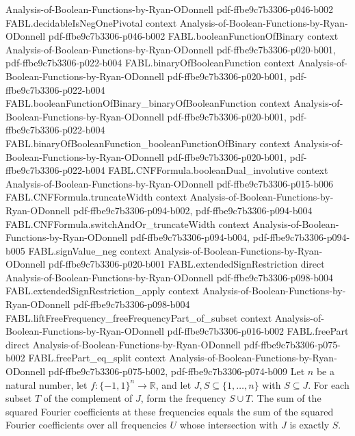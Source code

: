 \begin{theorem}
  {Analysis-of-Boolean-Functions-by-Ryan-ODonnell}
  {pdf-ffbe9c7b3306-p046-b002}
\proofstep
  {FABL.decidableIsNegOnePivotal}
  {context}
  {Analysis-of-Boolean-Functions-by-Ryan-ODonnell}
  {pdf-ffbe9c7b3306-p046-b002}
\proofstep
  {FABL.booleanFunctionOfBinary}
  {context}
  {Analysis-of-Boolean-Functions-by-Ryan-ODonnell}
  {pdf-ffbe9c7b3306-p020-b001,
    pdf-ffbe9c7b3306-p022-b004}
\proofstep
  {FABL.binaryOfBooleanFunction}
  {context}
  {Analysis-of-Boolean-Functions-by-Ryan-ODonnell}
  {pdf-ffbe9c7b3306-p020-b001,
    pdf-ffbe9c7b3306-p022-b004}
\proofstep
  {FABL.booleanFunctionOfBinary_binaryOfBooleanFunction}
  {context}
  {Analysis-of-Boolean-Functions-by-Ryan-ODonnell}
  {pdf-ffbe9c7b3306-p020-b001,
    pdf-ffbe9c7b3306-p022-b004}
\proofstep
  {FABL.binaryOfBooleanFunction_booleanFunctionOfBinary}
  {context}
  {Analysis-of-Boolean-Functions-by-Ryan-ODonnell}
  {pdf-ffbe9c7b3306-p020-b001,
    pdf-ffbe9c7b3306-p022-b004}
\proofstep
  {FABL.CNFFormula.booleanDual_involutive}
  {context}
  {Analysis-of-Boolean-Functions-by-Ryan-ODonnell}
  {pdf-ffbe9c7b3306-p015-b006}
\proofstep
  {FABL.CNFFormula.truncateWidth}
  {context}
  {Analysis-of-Boolean-Functions-by-Ryan-ODonnell}
  {pdf-ffbe9c7b3306-p094-b002,
    pdf-ffbe9c7b3306-p094-b004}
\proofstep
  {FABL.CNFFormula.switchAndOr_truncateWidth}
  {context}
  {Analysis-of-Boolean-Functions-by-Ryan-ODonnell}
  {pdf-ffbe9c7b3306-p094-b004,
    pdf-ffbe9c7b3306-p094-b005}
\proofstep
  {FABL.signValue_neg}
  {context}
  {Analysis-of-Boolean-Functions-by-Ryan-ODonnell}
  {pdf-ffbe9c7b3306-p020-b001}
\proofstep
  {FABL.extendedSignRestriction}
  {direct}
  {Analysis-of-Boolean-Functions-by-Ryan-ODonnell}
  {pdf-ffbe9c7b3306-p098-b004}
\proofstep
  {FABL.extendedSignRestriction_apply}
  {context}
  {Analysis-of-Boolean-Functions-by-Ryan-ODonnell}
  {pdf-ffbe9c7b3306-p098-b004}
\proofstep
  {FABL.liftFreeFrequency_freeFrequencyPart_of_subset}
  {context}
  {Analysis-of-Boolean-Functions-by-Ryan-ODonnell}
  {pdf-ffbe9c7b3306-p016-b002}
\proofstep
  {FABL.freePart}
  {direct}
  {Analysis-of-Boolean-Functions-by-Ryan-ODonnell}
  {pdf-ffbe9c7b3306-p075-b002}
\proofstep
  {FABL.freePart_eq_split}
  {context}
  {Analysis-of-Boolean-Functions-by-Ryan-ODonnell}
  {pdf-ffbe9c7b3306-p075-b002,
    pdf-ffbe9c7b3306-p074-b009}
Let $n$ be a natural number, let $f:\{-1,1\}^n\to\mathbb R$, and let
$J,S\subseteq\{1,\ldots,n\}$ with $S\subseteq J$. For each subset $T$ of the complement
of $J$, form the frequency $S\cup T$. The sum of the squared Fourier coefficients at
these frequencies equals the sum of the squared Fourier coefficients over all
frequencies $U$ whose intersection with $J$ is exactly $S$.
\end{theorem}

